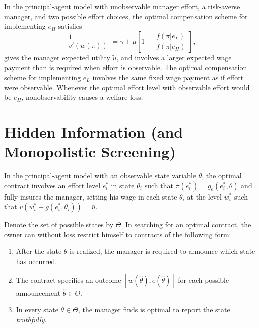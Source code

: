 \begin{prop}
    In the principal-agent model with unobservable manager effort, a risk-averse manager, and two possible effort choices, the optimal compensation scheme for implementing $e_H$ satisfies
    \begin{equation*}
        \begin{matrix}
            1 \\
            v'\left(w(\pi)\right)
        \end{matrix}
        = \gamma + \mu
        \left[1 - \begin{matrix}
            f(\pi | e_L) \\
            f(\pi | e_H)
        \end{matrix}\right],
    \end{equation*}
    gives the manager expected utility $\tilde{u}$, and involves a larger expected wage payment than is required when effort is observable. The optimal compensation scheme for implementing $e_L$ involves the same fixed wage payment as if effort were observable. Whenever the optimal effort level with observable effort would be $e_H$, nonobservability causes a welfare loss.
\end{prop}


\section{Hidden Information (and Monopolistic Screening)}

\begin{prop}
    In the principal-agent model with an observable state variable $\theta$, the optimal contract involves an effort level $e^*_i$ in state $\theta_i$ such that $\pi(e^*_i) = g_e(e^*_i, \theta)$ and fully insures the manager, setting his wage in each state $\theta_i$ at the level $w^*_i$ such that $v\left(w^*_i - g(e^*_i, \theta_i)\right) = \bar{u}$.   
\end{prop}

\begin{prop}
    Denote the set of possible states by $\Theta$. In searching for an optimal contract, the owner can without loss restrict himself to contracts of the following form:
    \begin{enumerate}
        \item After the state $\theta$ is realized, the manager is required to announce which state has occurred.
        \item The contract specifies an outcome $[w(\hat{\theta}), e(\hat{\theta})]$ for each possible announcement $\hat{\theta} \in \Theta$.
        \item In every state $\theta \in \Theta$, the manager finds is optimal to report the state \emph{truthfully}.
    \end{enumerate}
\end{prop}

